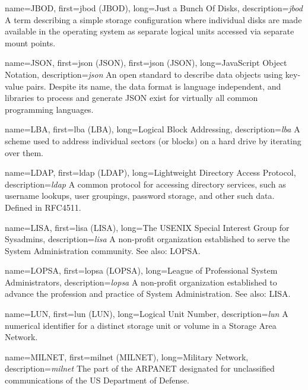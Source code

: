 {
	name={JBOD},
	first={\acrlong{jbod} (JBOD)},
	long={Just a Bunch Of Disks},
	description={{\em \acrlong{jbod}} A term describing a simple storage
configuration where individual disks are made available in the operating
system as separate logical units accessed via separate
mount points.}
}

{
	name={JSON},
	first={\acrlong{json} (JSON)},
	first={\acrlong{json} (JSON)},
	long={JavaScript Object Notation},
	description={{\em \acrlong{json}} An
open standard to describe data
objects using key-value pairs.  Despite its name, the
data format is language independent, and libraries to
process and generate JSON exist for virtually all
common programming languages.
	}
}

{
	name={LBA},
	first={\acrlong{lba} (LBA)},
	long={Logical Block Addressing},
	description={{\em \acrlong{lba}} A scheme used to address
individual sectors (or blocks) on a hard drive by
iterating over them.}
}

{
	name={LDAP},
	first={\acrlong{ldap} (LDAP)},
	long={Lightweight Directory Access Protocol},
	description={{\em \acrlong{ldap}} A common protocol
for accessing directory services, such as username lookups, user
groupings, password storage, and other such data.
Defined in RFC4511.}
}

{
	name={LISA},
	first={\acrlong{lisa} (LISA)},
	long={The USENIX Special Interest Group for Sysadmins},
	description={{\em \acrlong{lisa}} A non-profit
organization established to serve the System Administration community.
See also: LOPSA.}
}

{
	name={LOPSA},
	first={\acrlong{lopsa} (LOPSA)},
	long={League of Professional System Administrators},
	description={{\em \acrlong{lopsa}} A non-profit
organization established to advance the profession and practice of System
Administration.  See also: LISA.}
}

{
	name={LUN},
	first={\acrlong{lun} (LUN)},
	long={Logical Unit Number},
	description={{\em \acrlong{lun}} A numerical identifier for a distinct
storage unit or volume in a Storage Area Network.}
}

{
	name={MILNET},
	first={\acrlong{milnet} (MILNET)},
	long={Military Network},
	description={{\em \acrlong{milnet}} The part of the ARPANET designated
for unclassified communications of the US Department
of Defense.}
}

